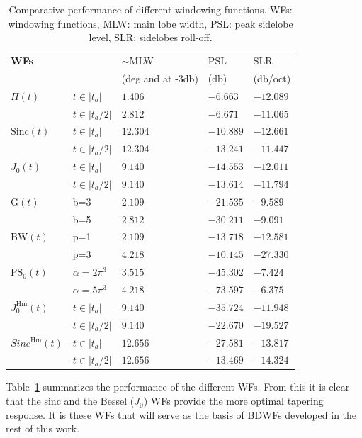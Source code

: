 \documentclass[useAMS,usenatbib]{mn2e}
\newcommand{\OMS}[1]{\textcolor{red}{{\bf OMS: #1}}}
\begin{document}
\begin{table}
\centering
\begin{tabular}{||l||ll|l|l||}
\hline
  \bf WFs&&{ $\sim$MLW} & { PSL}  & { SLR}   \\
  &&\hspace{-0.8cm}(deg and at -3db) & (db) & (db/oct)  \\
\hline\hline
{$\Pi(t)$}  & $t\in|t_a|$& $ 1.406$ &$-6.663$ &$-12.089$\\
	    & $t\in|t_a/2|$&$ 2.812$ &$-6.671$ &$-11.065$\\
\hline
{$\mathrm{Sinc}(t)$} & $t\in|t_a|$ &$ 12.304$& $-10.889$&  $-12.661$ \\
	 & $t\in|t_a/2|$ &$ 12.304$& $-13.241$&  $-11.447$ \\
\hline
{$J_0(t)$}& $t\in|t_a|$ &$ 9.140$ &$ -14.553$ & $ -12.011$\\
	  & $t\in|t_a/2|$ &$ 9.140$ &$ -13.614$ & $ -11.794$\\
\hline
{$\mathrm{G}(t)$} & b=3 &$ 2.109$& $-21.535$& $-9.589$\\ 
	 & b=5 &$ 2.812$& $-30.211$& $-9.091$\\ 
\hline
{$\mathrm{BW}(t)$} & p=1 &$ 2.109$ &$-13.718$ & $-12.581$\\
	  & p=3 &$ 4.218$ &$-10.145$ & $-27.330$\\
\hline
{$\mathrm{PS}_0(t)$} & $\alpha=2\pi^3$ &$ 3.515$& $-45.302$& $-7.424$\\ 
	 & $\alpha=5\pi^3$ &$ 4.218$& $-73.597$& $-6.375$\\ 
\hline
{$J_0^\mathrm{Hm}(t)$} & $t\in|t_a|$ &$ 9.140$&$-35.724$ & $-11.948$\\ 
 & $t\in|t_a/2|$ &$ 9.140$&$-22.670$&$-19.527$\\ 
\hline
{$Sinc^\mathrm{Hm}(t)$}  & $t\in|t_a|$ &$ 12.656 $&$-27.581$ &$-13.817$ \\ 
 &$t\in|t_a/2|$ &$12.656$&$-13.469$&$-14.324$\\
 \hline
\end{tabular}
\caption{\label{tab:WF:performance}Comparative performance of 
different windowing functions. WFs: windowing functions, MLW: main lobe width,  PSL: peak sidelobe level, SLR: sidelobes roll-off.}
\end{table}
Table~\ref{tab:WF:performance} summarizes the performance of the different WFs. From this it is clear that
the sinc and the Bessel ($J_0$) WFs provide the more optimal tapering response. It is these WFs that
will serve as the basis of BDWFs developed in the rest of this work. 
\end{document}
